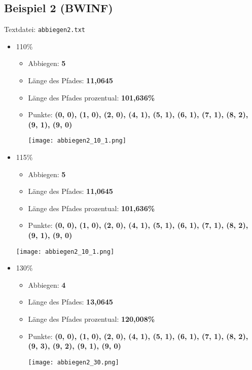 \documentclass[a4paper,10pt,ngerman]{scrartcl}
\begin{document}
\subsection{Beispiel 2 (BWINF)}

Textdatei: \texttt{abbiegen2.txt}

\begin{itemize}
  \item 110\%    
    \begin{itemize}
      \item Abbiegen: \textbf{5}
      \item Länge des Pfades: \textbf{11,0645}
      \item Länge des Pfades prozentual: \textbf{101,636\%}
      \item Punkte: \textbf{(0, 0), (1, 0), (2, 0), (4, 1), (5, 1), (6, 1), (7, 1), (8, 2), (9, 1), (9, 0)}
\begin{center}
\texttt{[image: abbiegen2\_10\_1.png]}
\end{center}
    \end{itemize}
  \item 115\%    
    \begin{itemize}
      \item Abbiegen: \textbf{5}
      \item Länge des Pfades: \textbf{11,0645}
      \item Länge des Pfades prozentual: \textbf{101,636\%}
      \item Punkte: \textbf{(0, 0), (1, 0), (2, 0), (4, 1), (5, 1), (6, 1), (7, 1), (8, 2), (9, 1), (9, 0)}
      \end{itemize}
\begin{center}
\texttt{[image: abbiegen2\_10\_1.png]}
\end{center}
  \item 130\%    
    \begin{itemize}
      \item Abbiegen: \textbf{4}
      \item Länge des Pfades: \textbf{13,0645}
      \item Länge des Pfades prozentual: \textbf{120,008\%}
      \item Punkte: \textbf{(0, 0), (1, 0), (2, 0), (4, 1), (5, 1), (6, 1), (7, 1), (8, 2), (9, 3), (9, 2), (9, 1), (9, 0)}
\begin{center}
\texttt{[image: abbiegen2\_30.png]}
\end{center}
    \end{itemize}

\end{itemize}
\end{document}
